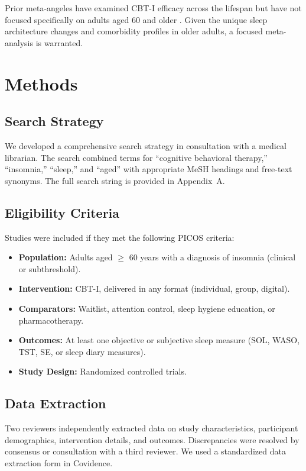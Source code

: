\documentclass[
    language=english,
    doctype=meta-analysis,
    institution=none,
]{../../omnilatex}
\begin{document}
Prior meta-angeles have examined CBT-I efficacy across the lifespan but have not focused
specifically on adults aged 60 and older \cite{trauer2015cognitive}. Given the unique
sleep architecture changes and comorbidity profiles in older adults, a focused meta-analysis
is warranted.

\section{Methods}
\label{sec:methods}

\subsection{Search Strategy}

We developed a comprehensive search strategy in consultation with a medical librarian.
The search combined terms for ``cognitive behavioral therapy,'' ``insomnia,'' ``sleep,''
and ``aged'' with appropriate MeSH headings and free-text synonyms. The full search string
is provided in Appendix~A.

\subsection{Eligibility Criteria}

Studies were included if they met the following PICOS criteria:
\begin{itemize}
    \item \textbf{Population:} Adults aged $\geq$ 60 years with a diagnosis of insomnia
          (clinical or subthreshold).
    \item \textbf{Intervention:} CBT-I, delivered in any format (individual, group, digital).
    \item \textbf{Comparators:} Waitlist, attention control, sleep hygiene education, or
          pharmacotherapy.
    \item \textbf{Outcomes:} At least one objective or subjective sleep measure (SOL, WASO,
          TST, SE, or sleep diary measures).
    \item \textbf{Study Design:} Randomized controlled trials.
\end{itemize}

\subsection{Data Extraction}

Two reviewers independently extracted data on study characteristics, participant demographics,
intervention details, and outcomes. Discrepancies were resolved by consensus or consultation
with a third reviewer. We used a standardized data extraction form in Covidence.
\end{document}
